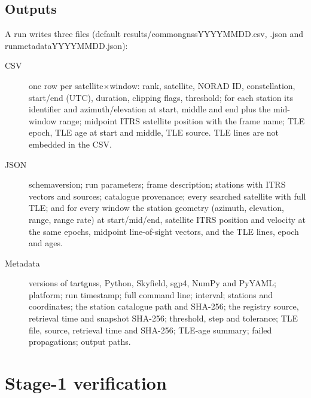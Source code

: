 \documentclass[11pt,a4paper]{article}
\newcommand{\code}[1]{{\ttfamily\def\_{\textunderscore\allowbreak}#1}}
\begin{document}
\subsection{Outputs}

A run writes three files (default \code{results/\allowbreak common\_gnss\_YYYYMMDD.csv},
\code{.json} and \code{run\_metadata\_YYYYMMDD.json}):
\begin{description}
\item[CSV] one row per satellite$\times$window: rank, satellite, NORAD ID,
constellation, start/end (UTC), duration, clipping flags, threshold; for each
station its identifier and azimuth/elevation at start, middle and end plus
the mid-window range; midpoint ITRS satellite position with the frame name;
TLE epoch, TLE age at start and middle, TLE source. TLE lines are not
embedded in the CSV.
\item[JSON] \code{schema\_version}; run parameters; frame description; stations with ITRS vectors
and sources; catalogue provenance; every searched satellite with full TLE;
and for every window the station geometry (azimuth, elevation, range, range
rate) at start/mid/end, satellite ITRS position and velocity at the same
epochs, midpoint line-of-sight vectors, and the TLE lines, epoch and ages.
\item[Metadata] versions of \code{tart\_gnss}, Python, Skyfield, sgp4, NumPy
and PyYAML; platform; run timestamp; full command line; interval;
stations and coordinates; the station catalogue path and SHA-256; the
registry source, retrieval time and snapshot SHA-256; threshold, step and
tolerance; TLE file, source, retrieval time and SHA-256; TLE-age summary;
failed propagations; output paths.
\end{description}

\section{Stage-1 verification}
\label{sec:verification}
\end{document}
